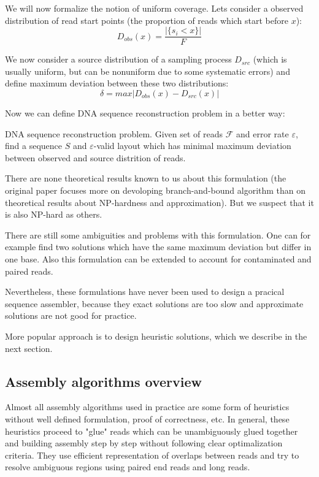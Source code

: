 We will now formalize the notion of uniform coverage. Lets consider a observed
distribution of read start points (the proportion of reads which start before $x$):
$$D_{obs}(x) = \frac{|\{s_i < x\}|}{F}$$

We now consider a source distribution of a sampling process $D_{src}$ (which is usually
uniform, but can be nonuniform due to some systematic errors) and define maximum
deviation between these two distributions:
$$\delta = max |D_{obs}(x) - D_{src}(x)|$$

Now we can define DNA sequence reconstruction problem in a better way:

\begin{definition}{DNA sequence reconstruction problem.}
Given set of reads $\mathcal{F}$ and error rate $\varepsilon$, find
a sequence $S$ and $\varepsilon$-valid layout which has minimal
maximum deviation between observed and source distrition of reads.
\end{definition}

There are none theoretical results known to us about this formulation
(the original paper focuses more on devoloping branch-and-bound algorithm
than on theoretical results about NP-hardness and approximation).
But we suspect that it is also NP-hard as others.

There are still some ambiguities and problems with this formulation.
One can for example find two solutions which have the same maximum deviation
but differ in one base.
Also this formulation can be extended to account for contaminated and paired
reads.

Nevertheless, these formulations have never been used to design
a pracical sequence assembler, because they exact solutions are too slow
and approximate solutions are not good for practice.

More popular approach is to design heuristic solutions, which we describe in the next
section.

\subsection{Assembly algorithms overview}

Almost all assembly algorithms used in practice are some form of heuristics
without well defined formulation, proof of correctness, etc.
In general, these heuristics proceed to "glue" reads which can be
unambiguously glued together and building assembly step by step
without following clear optimalization criteria.
They use efficient representation of overlaps between reads and try to resolve
ambiguous regions using paired end reads and long reads.

